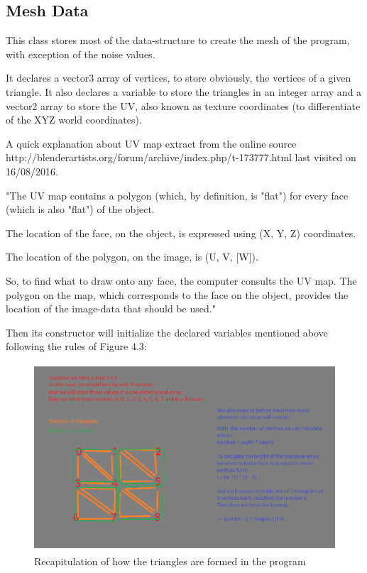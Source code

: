 \documentclass[a4paper,12pt]{book}
\begin{document}
\subsection{Mesh Data}

This class stores most of the data-structure to create the mesh of the program, with exception of the noise values.

It declares a vector3 array of vertices, to store obviously, the vertices of a given triangle. It also declares a variable to store the triangles in an integer array and a vector2 array to store the UV, also known as texture coordinates (to differentiate of the XYZ world coordinates).

A quick explanation about UV map extract from the online source http://blenderartists.org/forum/archive/index.php/t-173777.html last visited on 16/08/2016.

"The UV map contains a polygon (which, by definition, is "flat") for every face (which is also "flat") of the object.

The location of the face, on the object, is expressed using (X, Y, Z) coordinates.

The location of the polygon, on the image, is (U, V, [W]).

So, to find what to draw onto any face, the computer consults the UV map. The polygon on the map, which corresponds to the face on the object, provides the location of the image-data that should be used."

Then its constructor will initialize the declared variables mentioned above following the rules of Figure 4.3:
 
\begin{figure}
\begin{center}
\includegraphics[height=70mm]{mesh_research_5.png}
\end{center}
\caption{Recapitulation of how the triangles are formed in the program}
\label{fig:pretty}
\end{figure}
\end{document}
